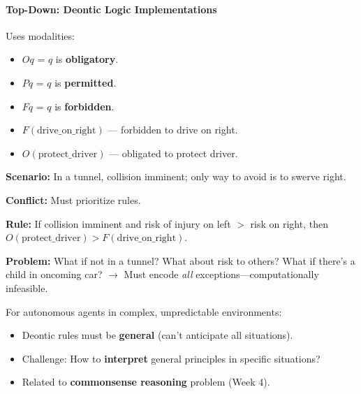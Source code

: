 \separator

\paragraph*{Top-Down: Deontic Logic Implementations}

\begin{defbox}
Uses modalities:
\begin{itemize}
  \item $Oq$ = $q$ is \textbf{obligatory}.
  \item $Pq$ = $q$ is \textbf{permitted}.
  \item $Fq$ = $q$ is \textbf{forbidden}.
\end{itemize}
\end{defbox}

\begin{exbox}
\begin{itemize}
  \item $F(\text{drive\_on\_right})$ --- forbidden to drive on right.
  \item $O(\text{protect\_driver})$ --- obligated to protect driver.
\end{itemize}

\textbf{Scenario:} In a tunnel, collision imminent; only way to avoid is to swerve right.

\textbf{Conflict:} Must prioritize rules.

\textbf{Rule:} If collision imminent and risk of injury on left $>$ risk on right, then $O(\text{protect\_driver}) > F(\text{drive\_on\_right})$.

\textbf{Problem:} What if not in a tunnel? What about risk to others? What if there's a child in oncoming car? $\to$ Must encode \textit{all} exceptions---computationally infeasible.
\end{exbox}

\begin{thmbox}
For autonomous agents in complex, unpredictable environments:
\begin{itemize}
  \item Deontic rules must be \textbf{general} (can't anticipate all situations).
  \item Challenge: How to \textbf{interpret} general principles in specific situations?
  \item Related to \textbf{commonsense reasoning} problem (Week 4).
\end{itemize}
\end{thmbox}

